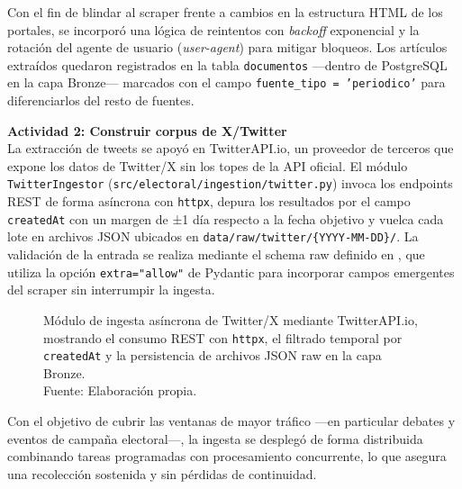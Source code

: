 Con el fin de blindar al scraper frente a cambios en la estructura HTML de los
portales, se incorporó una lógica de reintentos con \textit{backoff} exponencial y
la rotación del agente de usuario (\textit{user-agent}) para mitigar bloqueos. Los
artículos extraídos quedaron registrados en la tabla \texttt{documentos} —dentro
de PostgreSQL en la capa Bronze— marcados con el campo
\texttt{fuente\_tipo = 'periodico'} para diferenciarlos del resto de fuentes.

\textbf{Actividad 2: Construir corpus de X/Twitter}
\\
La extracción de tweets se apoyó en TwitterAPI.io, un proveedor de terceros que
expone los datos de Twitter/X sin los topes de la API oficial. El módulo
\texttt{TwitterIngestor} (\texttt{src/electoral/ingestion/twitter.py}) invoca los
endpoints REST de forma asíncrona con \texttt{httpx}, depura los resultados por el
campo \texttt{createdAt} con un margen de ±1 día respecto a la fecha objetivo y
vuelca cada lote en archivos JSON ubicados en
\texttt{data/raw/twitter/\{YYYY-MM-DD\}/}. La validación de la entrada se realiza
mediante el schema raw definido en ,
que utiliza la opción \texttt{extra="allow"} de Pydantic para incorporar campos
emergentes del scraper sin interrumpir la ingesta.

\begin{figure}[!ht]
    \begin{center}
        
        \caption[Módulo de ingesta asíncrona de Twitter/X mediante TwitterAPI.io]{Módulo de ingesta asíncrona de Twitter/X mediante TwitterAPI.io, mostrando el consumo REST con \texttt{httpx}, el filtrado temporal por \texttt{createdAt} y la persistencia de archivos JSON raw en la capa Bronze.\\Fuente: Elaboración propia.}
        \label{5:fig3}
    \end{center}
\end{figure}

Con el objetivo de cubrir las ventanas de mayor tráfico —en particular debates y
eventos de campaña electoral—, la ingesta se desplegó de forma distribuida
combinando tareas programadas con procesamiento concurrente, lo que asegura una
recolección sostenida y sin pérdidas de continuidad.

